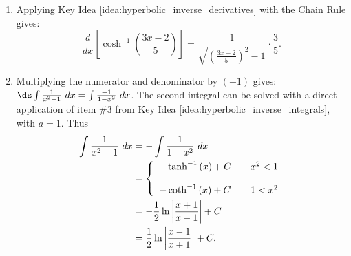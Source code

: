{\begin{enumerate}
\item		Applying Key Idea \ref{idea:hyperbolic_inverse_derivatives} with the Chain Rule gives:
		\[
		\frac{d}{dx}\left[\cosh^{-1}\left(\frac{3x-2}5\right)\right] = \frac{1}{\sqrt{\left(\frac{3x-2}5\right)^2-1}}\cdot\frac35.
		\]

\item		Multiplying the numerator and denominator by $(-1)$ gives: $\ds \int \frac{1}{x^2-1}\ dx = \int \frac{-1}{1-x^2}\ dx$. The second integral can be solved with a direct application of item \#3 from Key Idea \ref{idea:hyperbolic_inverse_integrals}, with $a=1$. Thus
\begin{align}
\int \frac{1}{x^2-1}\ dx &= -\int \frac{1}{1-x^2}\ dx \notag \\
		&= \left\{\begin{array}{ccc} -\tanh^{-1}\left(x\right)+C & & x^2<1 \\ \\
-\coth^{-1}\left(x\right)+C & & 1<x^2 \end{array}\right. \notag\\
     &=-\frac12\ln\left|\frac{x+1}{x-1}\right|+C\notag\\
     &=\frac12\ln\left|\frac{x-1}{x+1}\right|+C.\label{eq:hf3}
     \end{align}


%
\enlargethispage{\baselineskip}


\end{enumerate}}
